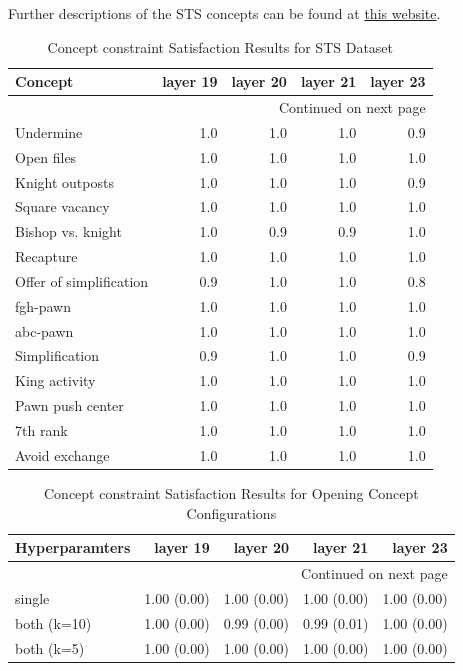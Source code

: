 \documentclass{article}
\begin{document}
Further descriptions of the STS concepts can be found at \href{https://sites.google.com/site/strategictestsuite/about}{this website}.

\begin{longtable}{lrrrr}
\caption{Concept constraint Satisfaction Results for STS Dataset}
\label{table:sts} \\ 
\toprule
                 Concept  &  layer 19 &  layer 20 &  layer 21 &  layer 23 \\
\midrule
\endhead
\midrule
\multicolumn{5}{r}{{Continued on next page}} \\
\midrule
\endfoot
\bottomrule
\endlastfoot
               Undermine &      1.0 &      1.0 &      1.0 &      0.9 \\
              Open files &      1.0 &      1.0 &      1.0 &      1.0 \\
         Knight outposts &      1.0 &      1.0 &      1.0 &      0.9 \\
          Square vacancy &      1.0 &      1.0 &      1.0 &      1.0 \\
       Bishop vs. knight &      1.0 &      0.9 &      0.9 &      1.0 \\
               Recapture &      1.0 &      1.0 &      1.0 &      1.0 \\
 Offer of simplification &      0.9 &      1.0 &      1.0 &      0.8 \\
                fgh-pawn &      1.0 &      1.0 &      1.0 &      1.0 \\
                abc-pawn &      1.0 &      1.0 &      1.0 &      1.0 \\
          Simplification &      0.9 &      1.0 &      1.0 &      0.9 \\
           King activity &      1.0 &      1.0 &      1.0 &      1.0 \\
               Pawn push center &      1.0 &      1.0 &      1.0 &      1.0 \\
                7th rank &      1.0 &      1.0 &      1.0 &      1.0 \\
          Avoid exchange &      1.0 &      1.0 &      1.0 &      1.0 \\
\end{longtable}


\begin{longtable}{lrrrr}
\caption{Concept constraint Satisfaction Results for Opening Concept Configurations}
\label{table:opening_hyper} \\ 
\toprule
Hyperparamters &  layer 19 &  layer 20 &  layer 21 &  layer 23 \\
\midrule
\endhead
\midrule
\multicolumn{5}{r}{{Continued on next page}} \\
\midrule
\endfoot
\bottomrule
\endlastfoot
        single &     1.00 (0.00) &     1.00 (0.00) &     1.00 (0.00) &     1.00 (0.00) \\
   both (k=10) &     1.00 (0.00) &     0.99 (0.00) &     0.99 (0.01) &     1.00 (0.00) \\
    both (k=5) &     1.00 (0.00) &     1.00 (0.00) &     1.00 (0.00) &     1.00 (0.00) \\
\end{longtable}
\end{document}
